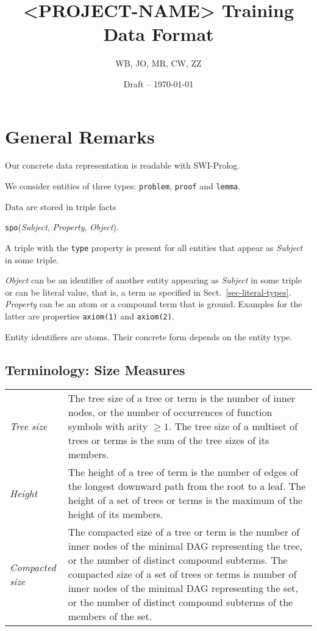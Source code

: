 \documentclass[a4paper,11pt]{article}
\title{<PROJECT-NAME> Training Data Format}
\author{WB, JO, MR, CW, ZZ}
\date{Draft -- \today}
\newcommand{\f}[1]{\texttt{#1}}
\newcommand{\var}[1]{\textnormal{\textit{#1}}}
\begin{document}
\maketitle


\section{General Remarks}

Our concrete data representation is readable with SWI-Prolog.

We consider entities of three types: \f{problem}, \f{proof} and \f{lemma}.

Data are stored in triple facts
\begin{center}
\f{spo}(\var{Subject}, \var{Property}, \var{Object}).
\end{center}

A triple with the \f{type} property is present for all entities that appear as
\var{Subject} in some triple.

\var{Object} can be an identifier of another entity appearing as \var{Subject}
in some triple or can be literal value, that is, a term as specified in
Sect.~\ref{sec-literal-types}. \var{Property} can be an atom or a compound
term that is ground. Examples for the latter are properties \f{axiom(1)} and
\f{axiom(2)}.

Entity identifiers are atoms. Their concrete form depends on the entity type.


\subsection{Terminology: Size Measures}
\begin{longtable}{lL{28em}}
  \emph{Tree size} & The tree size of a tree or term is the number of inner
  nodes, or the number of occurrences of function symbols with arity $\geq 1$.
  The tree size of a multiset of trees or terms is the sum of the tree sizes
  of its members.\\
 \emph{Height} & The height of a tree of term is the number
  of edges of the longest downward path from the root to a leaf. The height of
  a set of trees or terms is the maximum of the height of its members.\\
  \emph{Compacted size} & The compacted size of a tree or term is the number of
  inner nodes of the minimal DAG representing the tree, or the number of
  distinct compound subterms. The compacted size of a set of trees or terms is
  number of inner nodes of the minimal DAG representing the set, or the number
  of distinct compound subterms of the members of the set.
\end{longtable}
\end{document}
